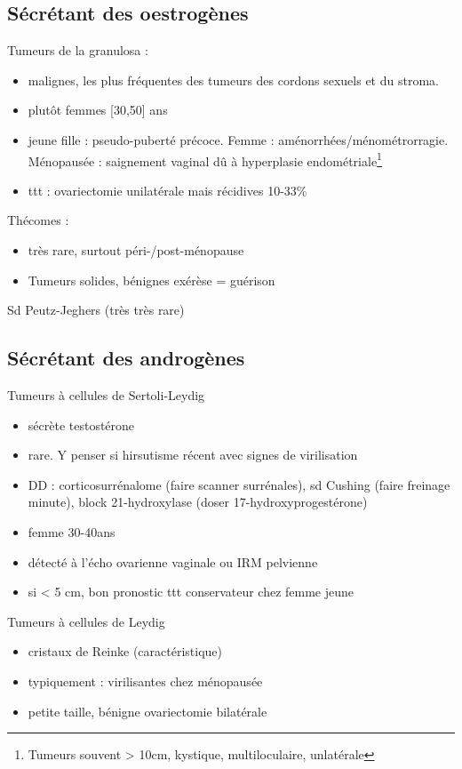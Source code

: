\documentclass{book}
\begin{document}
\subsection{Sécrétant des oestrogènes}
\label{sec:org6f528ce}
Tumeurs de la granulosa : 
\begin{itemize}
\item malignes, les plus fréquentes des tumeurs des cordons sexuels et du stroma.
\item plutôt femmes [30,50] ans
\item jeune fille : pseudo-puberté précoce. Femme :
aménorrhées/ménométrorragie. Ménopausée : saignement vaginal dû à hyperplasie
endométriale\footnote{Tumeurs souvent > 10cm, kystique, multiloculaire, unlatérale}
\item ttt : ovariectomie unilatérale mais récidives 10-33\%
\end{itemize}

Thécomes : 
\begin{itemize}
\item très rare, surtout péri-/post-ménopause
\item Tumeurs solides, bénignes \thus exérèse = guérison
\end{itemize}
Sd Peutz-Jeghers (très très rare)

\subsection{Sécrétant des androgènes}
\label{sec:org0085117}
Tumeurs à cellules de Sertoli-Leydig 
\begin{itemize}
\item sécrète testostérone
\item rare. Y penser si hirsutisme récent avec signes de virilisation
\item DD : corticosurrénalome (faire scanner surrénales), sd Cushing (faire freinage
minute), block 21-hydroxylase (doser 17-hydroxyprogestérone)
\item femme 30-40ans
\item détecté à l'écho ovarienne vaginale ou IRM pelvienne
\item si < 5 cm, bon pronostic \thus ttt conservateur chez femme jeune
\end{itemize}

Tumeurs à cellules de Leydig
\begin{itemize}
\item cristaux de Reinke (caractéristique)
\item typiquement : virilisantes chez ménopausée
\item petite taille, bénigne \thus ovariectomie bilatérale
\end{itemize}
\end{document}
